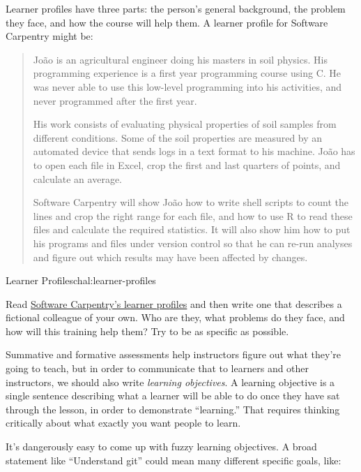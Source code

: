 Learner profiles have three parts: the person's general background, the
problem they face, and how the course will help them. A learner profile
for Software Carpentry might be:

\begin{quote}
Jo\~{a}o is an agricultural engineer doing his masters in soil physics. His
programming experience is a first year programming course using C. He
was never able to use this low-level programming into his activities,
and never programmed after the first year.

His work consists of evaluating physical properties of soil samples from
different conditions. Some of the soil properties are measured by an
automated device that sends logs in a text format to his machine. Jo\~{a}o
has to open each file in Excel, crop the first and last quarters of
points, and calculate an average.

Software Carpentry will show Jo\~{a}o how to write shell scripts to count
the lines and crop the right range for each file, and how to use R to
read these files and calculate the required statistics. It will also
show him how to put his programs and files under version control so that
he can re-run analyses and figure out which results may have been
affected by changes.
\end{quote}

\begin{challenge}{Learner Profiles}{chal:learner-profiles}

Read \href{http://software-carpentry.org/audience/}{Software Carpentry's
learner profiles} and then write one that describes a fictional
colleague of your own. Who are they, what problems do they face, and how
will this training help them? Try to be as specific as possible.
\end{challenge}


Summative and formative assessments help instructors figure out what
they're going to teach, but in order to communicate that to learners and
other instructors, we should also write \emph{learning objectives}. A
learning objective is a single sentence describing what a learner will
be able to do once they have sat through the lesson, in order to
demonstrate ``learning.'' That requires thinking critically about what
exactly you want people to learn.

It's dangerously easy to come up with fuzzy learning objectives. A broad
statement like ``Understand git'' could mean many different specific
goals, like:

